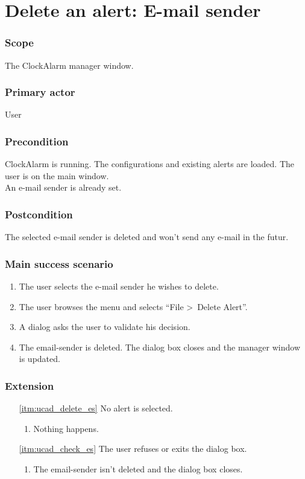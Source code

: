 \section{Delete an alert: E-mail sender}\label{subsec:usecase_delete_email_sender}

\subsubsection{Scope}
The ClockAlarm manager window.
\subsubsection{Primary actor}
User
\subsubsection{Precondition}
ClockAlarm is running. The configurations and existing alerts are loaded. The user is on the main window.
\\An e-mail sender is already set.
\subsubsection{Postcondition}
The selected e-mail sender is deleted and won't send any e-mail in the futur.
\subsubsection{Main success scenario}
\begin{enumerate}
	\item The user selects the e-mail sender he wishes to delete.
	\item \label{itm:ucad_delete_es} The user browses the menu and selects ``File \textgreater~Delete Alert''.
	\item \label{itm:ucad_check_es} A dialog asks the user to validate his decision.
	\item The email-sender is deleted. The dialog box closes and the manager window is updated.
\end{enumerate}
\subsubsection{Extension}
\begin{enumerate}
	\item[\ref{itm:ucad_delete_es}] No alert is selected.
	\begin{enumerate}[i]
		\item Nothing happens.
	\end{enumerate}
	
	\item[\ref{itm:ucad_check_es}] The user refuses or exits the dialog box.
	\begin{enumerate}[i]
		\item The email-sender isn't deleted and the dialog box closes.
	\end{enumerate}
\end{enumerate}
